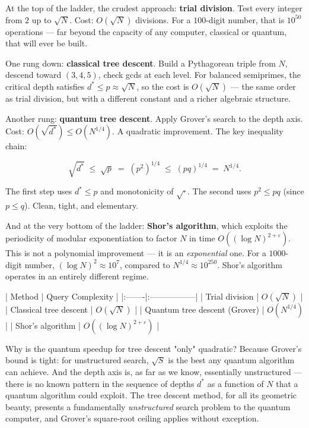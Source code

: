 \documentclass[11pt,openright,twoside]{book}
\theoremstyle{definition}
\begin{document}
At the top of the ladder, the crudest approach: \textbf{trial division}. Test every integer from $2$ up to $\sqrt{N}$. Cost: $O(\sqrt{N})$ divisions. For a $100$-digit number, that is $10^{50}$ operations --- far beyond the capacity of any computer, classical or quantum, that will ever be built.

One rung down: \textbf{classical tree descent}. Build a Pythagorean triple from $N$, descend toward $(3, 4, 5)$, check gcds at each level. For balanced semiprimes, the critical depth satisfies $d^* \leq p \approx \sqrt{N}$, so the cost is $O(\sqrt{N})$ --- the same order as trial division, but with a different constant and a richer algebraic structure.

Another rung: \textbf{quantum tree descent}. Apply Grover's search to the depth axis. Cost: $O(\sqrt{d^*}) \leq O(N^{1/4})$. A quadratic improvement. The key inequality chain:

\[\sqrt{d^*} \;\leq\; \sqrt{p} \;=\; (p^2)^{1/4} \;\leq\; (pq)^{1/4} \;=\; N^{1/4}.\]

The first step uses $d^* \leq p$ and monotonicity of $\sqrt{\cdot}$. The second uses $p^2 \leq pq$ (since $p \leq q$). Clean, tight, and elementary.

And at the very bottom of the ladder: \textbf{Shor's algorithm}, which exploits the periodicity of modular exponentiation to factor $N$ in time $O((\log N)^{2+\varepsilon})$. This is not a polynomial improvement --- it is an \textit{exponential} one. For a $1000$-digit number, $(\log N)^2 \approx 10^7$, compared to $N^{1/4} \approx 10^{250}$. Shor's algorithm operates in an entirely different regime.

| Method | Query Complexity |
|:-------|:-----------------|
| Trial division | $O(\sqrt{N})$ |
| Classical tree descent | $O(\sqrt{N})$ |
| Quantum tree descent (Grover) | $O(N^{1/4})$ |
| Shor's algorithm | $O((\log N)^{2+\varepsilon})$ |

Why is the quantum speedup for tree descent "only" quadratic? Because Grover's bound is tight: for unstructured search, $\sqrt{S}$ is the best any quantum algorithm can achieve. And the depth axis is, as far as we know, essentially unstructured --- there is no known pattern in the sequence of depths $d^*$ as a function of $N$ that a quantum algorithm could exploit. The tree descent method, for all its geometric beauty, presents a fundamentally \textit{unstructured} search problem to the quantum computer, and Grover's square-root ceiling applies without exception.
\end{document}
